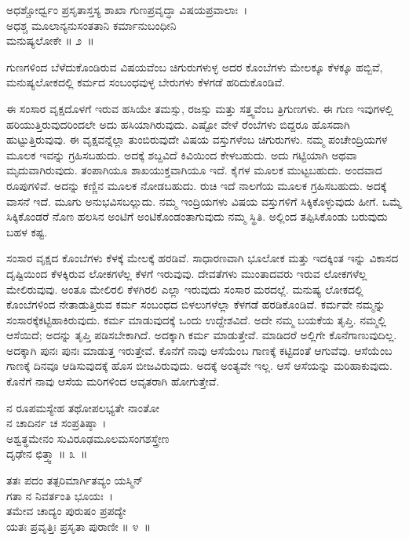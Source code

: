 \begin{shloka}
ಅಧಶ್ಚೋರ್ಧ್ವಂ ಪ್ರಸೃತಾಸ್ತಸ್ಯ ಶಾಖಾ ಗುಣಪ್ರವೃದ್ಧಾ ವಿಷಯಪ್ರವಾಲಾಃ~।\\ಅಧಶ್ಚ ಮೂಲಾನ್ಯನುಸಂತತಾನಿ ಕರ್ಮಾನುಬಂಧೀನಿ\\ ಮನುಷ್ಯಲೋಕೇ \hfill॥ ೨~॥
\end{shloka}

\begin{artha}
ಗುಣಗಳಿಂದ ಬೆಳೆದುಕೊಂಡಿರುವ ವಿಷಯವೆಂಬ ಚಿಗುರುಗಳುಳ್ಳ ಅದರ ಕೊಂಬೆಗಳು ಮೇಲಕ್ಕೂ ಕೆಳಕ್ಕೂ ಹಬ್ಬಿವೆ, ಮನುಷ್ಯಲೋಕದಲ್ಲಿ ಕರ್ಮದ ಸಂಬಂಧವುಳ್ಳ ಬೇರುಗಳು ಕೆಳಗಡೆ ಹರಿದು\-ಕೊಂಡಿವೆ.
\end{artha}

ಈ ಸಂಸಾರ ವೃಕ್ಷದೊಳಗೆ ಇರುವ ಹಸಿಯೇ ತಮಸ್ಸು, ರಜಸ್ಸು ಮತ್ತು ಸತ್ತ್ವವೆಂಬ ತ್ರಿಗುಣಗಳು. ಈ ಗುಣ ಇವುಗಳಲ್ಲಿ ಹರಿಯುತ್ತಿರುವುದರಿಂದಲೇ ಅದು ಹಸಿಯಾಗಿರುವುದು. ಎಷ್ಟೋ ವೇಳೆ ರೆಂಬೆಗಳು ಬಿದ್ದರೂ ಹೊಸದಾಗಿ ಹುಟ್ಟುತ್ತಿರುವುವು. ಈ ವೃಕ್ಷವನ್ನೆಲ್ಲಾ ತುಂಬಿರುವುದೇ ವಿಷಯ ವಸ್ತುಗಳೆಂಬ ಚಿಗುರುಗಳು. ನಮ್ಮ ಪಂಚೇಂದ್ರಿಯಗಳ ಮೂಲಕ ಇವನ್ನು ಗ್ರಹಿಸಬಹುದು. ಅದಕ್ಕೆ ಶಬ್ದವಿದೆ ಕಿವಿಯಿಂದ ಕೇಳಬಹುದು. ಅದು ಗಟ್ಟಿಯಾಗಿ ಅಥವಾ ಮೃದು\-ವಾಗಿರುವುದು. ತಂಪಾಗಿಯೂ ಶಾಖಯುಕ್ತವಾಗಿಯೂ ಇದೆ. ಕೈಗಳ ಮೂಲಕ ಮುಟ್ಟಬಹುದು. ಅಂದವಾದ ರೂಪುಗಳಿವೆ. ಅದನ್ನು ಕಣ್ಣಿನ ಮೂಲಕ ನೋಡಬಹುದು. ರುಚಿ ಇದೆ ನಾಲಗೆಯ ಮೂಲಕ ಗ್ರಹಿಸಬಹುದು. ಅದಕ್ಕೆ ವಾಸನೆ ಇದೆ. ಮೂಗು ಅನುಭವಿಸಬಲ್ಲುದು. ನಮ್ಮ ಇಂದ್ರಿಯಗಳು ವಿಷಯ ವಸ್ತುಗಳಿಗೆ ಸಿಕ್ಕಿಕೊಳ್ಳುವುದು ಹೀಗೆ. ಒಮ್ಮೆ ಸಿಕ್ಕಿಕೊಂಡರೆ ನೊಣ ಹಲಸಿನ ಅಂಟಿಗೆ ಅಂಟಿಕೊಂಡಂತಾಗುವುದು ನಮ್ಮ ಸ್ಥಿತಿ. ಅಲ್ಲಿಂದ ತಪ್ಪಿಸಿಕೊಂಡು ಬರುವುದು ಬಹಳ ಕಷ್ಟ.

ಸಂಸಾರ ವೃಕ್ಷದ ಕೊಂಬೆಗಳು ಕೆಳಕ್ಕೆ ಮೇಲಕ್ಕೆ ಹರಡಿವೆ. ಸಾಧಾರಣವಾಗಿ ಭೂಲೋಕ ಮತ್ತು ಇದಕ್ಕಿಂತ ಇನ್ನು ವಿಕಾಸದ ದೃಷ್ಟಿಯಿಂದ ಕೆಳಕ್ಕಿರುವ ಲೋಕಗಳೆಲ್ಲ ಕೆಳಗೆ ಇರುವುವು. ದೇವತೆಗಳು ಮುಂತಾದವರು ಇರುವ ಲೋಕಗಳೆಲ್ಲ ಮೇಲಿರುವುವು. ಅಂತೂ ಮೇಲಿರಲಿ ಕೆಳಗಿರಲಿ ಎಲ್ಲಾ ಇರುವುದು ಸಂಸಾರ ಮರದಲ್ಲೆ. ಮನುಷ್ಯ ಲೋಕದಲ್ಲಿ ಕೊಂಬೆಗಳಿಂದ ನೇತಾಡುತ್ತಿರುವ ಕರ್ಮ ಸಂಬಂಧದ ಬಿಳಲುಗಳೆಲ್ಲಾ ಕೆಳಗಡೆ ಹರಡಿಕೊಂಡಿವೆ. ಕರ್ಮವೇ ನಮ್ಮನ್ನು ಸಂಸಾರಕ್ಕೆ\break ಕಟ್ಟಿಹಾಕಿರುವುದು. ಕರ್ಮ ಮಾಡುವುದಕ್ಕೆ ಒಂದು ಉದ್ದೇಶವಿದೆ. ಅದೇ ನಮ್ಮ ಬಯಕೆಯ ತೃಪ್ತಿ. ನಮ್ಮಲ್ಲಿ ಆಸೆಯಿದೆ; ಅದನ್ನು ತೃಪ್ತಿ ಪಡಿಸಬೇಕಾಗಿದೆ. ಅದಕ್ಕಾಗಿ ಕರ್ಮ ಮಾಡುತ್ತೇವೆ. ಮಾಡಿದರೆ ಅಲ್ಲಿಗೇ ಕೊನೆಗಾಣುವುದಿಲ್ಲ. ಅದಕ್ಕಾಗಿ ಪುನಃ ಪುನಃ ಮಾಡುತ್ತ ಇರುತ್ತೇವೆ. ಕೊನೆಗೆ ನಾವು ಆಸೆಯೆಂಬ ಗಾಣಕ್ಕೆ ಕಟ್ಟಿದಂತೆ ಆಗುವೆವು. ಆಸೆಯೆಂಬ ಗಾಣಕ್ಕೆ ದಿನವೂ ಆಡಿಸುವುದಕ್ಕೆ ಹೊಸ ಬೀಜವಿರುವುದು. ಅದಕ್ಕೆ ಅಂತ್ಯವೇ ಇಲ್ಲ. ಆಸೆ ಆಸೆಯನ್ನು ಮರಿಹಾಕುವುದು. ಕೊನೆಗೆ ನಾವು ಆಸೆಯ ಮರಿಗಳಿಂದ ಆವೃತರಾಗಿ ಹೋಗುತ್ತೇವೆ.

\begin{shloka}
ನ ರೂಪಮಸ್ಯೇಹ ತಥೋಪಲಭ್ಯತೇ ನಾಂತೋ\\ ನ ಚಾದಿರ್ನ ಚ ಸಂಪ್ರತಿಷ್ಠಾ~।\\ಅಶ್ವತ್ಥಮೇನಂ ಸುವಿರೂಢಮೂಲಮಸಂಗಶಸ್ತ್ರೇಣ\\ ದೃಢೇನ ಛಿತ್ತ್ವಾ \hfill॥ ೩~॥
\end{shloka}

\begin{shloka}
ತತಃ ಪದಂ ತತ್ಪರಿಮಾರ್ಗಿತವ್ಯಂ ಯಸ್ಮಿನ್\\ ಗತಾ ನ ನಿವರ್ತಂತಿ ಭೂಯಃ~।\\ತಮೇವ ಚಾದ್ಯಂ ಪುರುಷಂ ಪ್ರಪದ್ಯೇ\\ ಯತಃ ಪ್ರವೃತ್ತಿಃ ಪ್ರಸೃತಾ ಪುರಾಣೀ \hfill॥ ೪~॥
\end{shloka}


